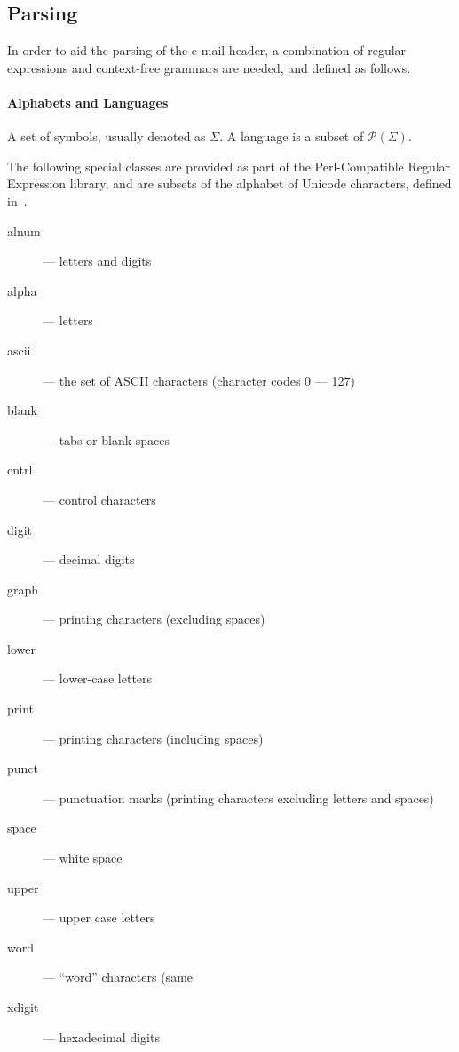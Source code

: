 \subsection{Parsing}

In order to aid the parsing of the e-mail header, a combination of regular
expressions and context-free grammars are needed, and defined as follows.

\paragraph{Alphabets and Languages}

A set of symbols, usually denoted as $\Sigma$.  A language is a subset of
$\mathcal P (\Sigma)$.

The following special classes are provided as part of the Perl-Compatible
Regular Expression library, and are subsets of the alphabet of Unicode
characters, defined in~\cite{php_group_gutmans_lerdorf_suraski_boerger}.

\begin{description}

\item[alnum] --- letters and digits

\item[alpha] --- letters

\item[ascii] --- the set of ASCII characters (character codes 0 --- 127)

\item[blank] --- tabs or blank spaces

\item[cntrl] --- control characters

\item[digit] --- decimal digits

\item[graph] --- printing characters (excluding spaces)

\item[lower] --- lower-case letters

\item[print] --- printing characters (including spaces)

\item[punct] --- punctuation marks (printing characters excluding letters and spaces)

\item[space] --- white space

\item[upper] --- upper case letters

\item[word] --- ``word'' characters (same

\item[xdigit] --- hexadecimal digits

\end{description}

